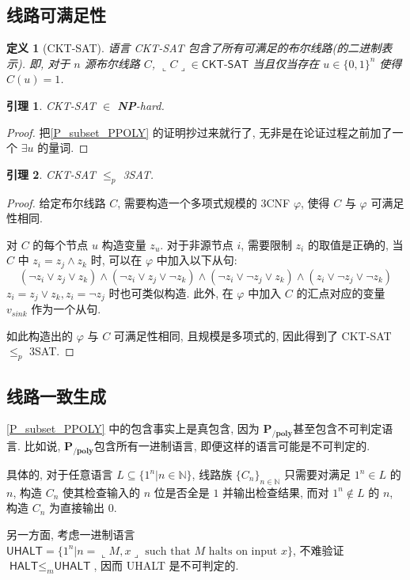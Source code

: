 \documentclass[8pt]{article}
\theoremstyle{compact}
\newtheorem{lemma}{引理}[section]
\newtheorem{definition}{定义}[section]
\def\le{\leqslant}
\def\rep#1{\llcorner{#1}\lrcorner}
\def\NP{\textbf{NP}}
\def\PPOLY{$\textbf{P}_{\textbf{/poly}}$}
\begin{document}
\subsection{线路可满足性}
\begin{definition}[\textsf{CKT-SAT}]
	语言 \textsf{CKT-SAT} 包含了所有可满足的布尔线路(的二进制表示). 即, 对于 $n$ 源布尔线路 $C$, $\rep{C} \in \textsf{CKT-SAT}$ 当且仅当存在 $u \in \{0, 1\}^n$ 使得 $C(u) = 1$.
\end{definition}
\begin{lemma}
	\textsf{CKT-SAT} $\in$ \NP-hard.
\end{lemma}
\begin{proof}
	把\cref{P_subset_PPOLY} 的证明抄过来就行了, 无非是在论证过程之前加了一个 $\exists u$ 的量词.
\end{proof}
\begin{lemma}
	\textsf{CKT-SAT} $\le_p$ \textsf{3SAT}.
\end{lemma}
\begin{proof}
	给定布尔线路 $C$, 需要构造一个多项式规模的 3CNF $\varphi$, 使得 $C$ 与 $\varphi$ 可满足性相同.

	对 $C$ 的每个节点 $u$ 构造变量 $z_u$. 对于非源节点 $i$, 需要限制 $z_i$ 的取值是正确的, 当 $C$ 中 $z_i = z_j \wedge z_k$ 时, 可以在 $\varphi$ 中加入以下从句: $$(\lnot z_i \vee z_j \vee z_k) \wedge (\lnot z_i \vee z_j \vee \lnot z_k) \wedge (\lnot z_i \vee \lnot z_j \vee z_k) \wedge (z_i \vee \lnot z_j \vee \lnot z_k)$$
	$z_i = z_j \vee z_k, z_i = \lnot z_j$ 时也可类似构造. 此外, 在 $\varphi$ 中加入 $C$ 的汇点对应的变量 $v_{sink}$ 作为一个从句.

	如此构造出的 $\varphi$ 与 $C$ 可满足性相同, 且规模是多项式的, 因此得到了 \textsf{CKT-SAT} $\le_p$ \textsf{3SAT}.
\end{proof}

\subsection{线路一致生成}
\cref{P_subset_PPOLY} 中的包含事实上是真包含, 因为 \PPOLY 甚至包含不可判定语言. 比如说, \PPOLY 包含所有一进制语言, 即便这样的语言可能是不可判定的.

具体的, 对于任意语言 $L \subseteq \{1^n | n \in \mathbb N\}$, 线路族 $\{C_n\}_{n \in \mathbb N}$ 只需要对满足 $1^n \in L$ 的 $n$, 构造 $C_n$ 使其检查输入的 $n$ 位是否全是 $1$ 并输出检查结果, 而对 $1^n \notin L$ 的 $n$, 构造 $C_n$ 为直接输出 $0$.

另一方面, 考虑一进制语言 $\textsf{UHALT} = \{1^n | n = \rep{M, x} \text{ such that } M \text{ halts on input } x\}$, 不难验证 $\textsf{HALT} \le_m \textsf{UHALT}$, 因而 \textsf{UHALT} 是不可判定的.
\end{document}
